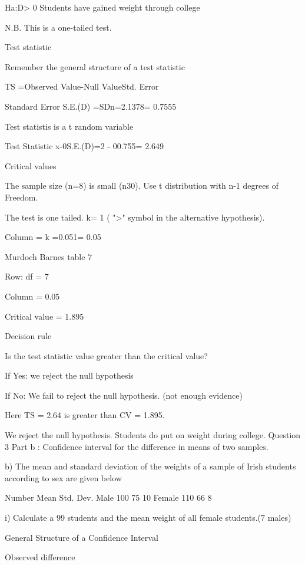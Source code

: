 \documentclass[12pt]{report}
\begin{document}
Ha:D> 0    Students have  gained weight through college


N.B. This is a one-tailed test.

Test statistic

Remember the general structure of a test statistic

TS =Observed Value-Null ValueStd. Error 



Standard Error		S.E.(D) =SDn=2.1378= 0.7555

Test statistis is a t random variable

Test Statistic		x-0S.E.(D)=2 - 00.755= 2.649


Critical values

The sample size (n=8) is small (n30). Use t distribution with n-1 degrees of Freedom.


The test is one tailed.  k= 1  ( ">" symbol in the alternative hypothesis).


Column = k =0.051= 0.05


Murdoch Barnes table 7


Row: df = 7

Column = 0.05

Critical value =  1.895    

Decision rule


Is the test statistic value greater than the critical value?

If Yes: we reject the null hypothesis

If No: We fail to reject the null hypothesis. (not enough evidence)


Here TS = 2.64  is greater than CV = 1.895.


We reject the null hypothesis. Students do put on weight during college. 
Question 3 Part b : Confidence interval for the difference in means of two samples.

b) The mean and standard deviation of the weights of a sample of Irish students according to sex are given below


Number
Mean
Std. Dev.
Male
100
75
10
Female
110
66
8

i)        Calculate a 99%
students and the mean weight of all female students.(7 males)

General Structure of a Confidence Interval





Observed difference
\end{document}
